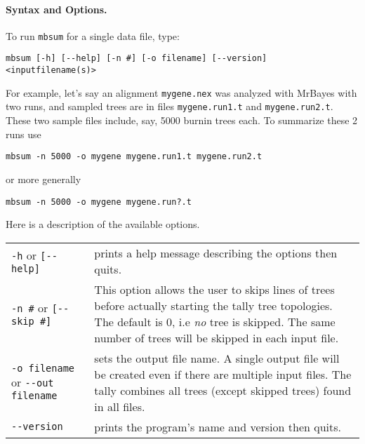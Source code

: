 \documentclass[12pt,english,final,letterpaper]{article}
\newcommand{\com}[1]{}
\begin{document}
\paragraph{Syntax and Options.}
To run {\tt mbsum} for a single data file, type:
\begin{verbatim}
mbsum [-h] [--help] [-n #] [-o filename] [--version] <inputfilename(s)> 
\end{verbatim}
For example, let's say an alignment \texttt{mygene.nex} was 
analyzed with MrBayes with two runs, and sampled trees are in files
\texttt{mygene.run1.t} and \texttt{mygene.run2.t}. These two
sample files include, say, 5000 burnin trees each. To summarize 
these 2 runs  use
\begin{verbatim}
mbsum -n 5000 -o mygene mygene.run1.t mygene.run2.t
\end{verbatim}
or more generally
\begin{verbatim}
mbsum -n 5000 -o mygene mygene.run?.t
\end{verbatim}
\com{
 Note: the older version of \texttt{mbsum} could only take a single
 file. It was then necessary to have a single file for each locus, 
 and to combine all independent MrBayes runs from the same locus
 into a single file. This is no longer necessary. 
 With version 1.2b of \texttt{mbsum}, there can be several 
 input files, such as several parallel runs from MrBayes.
}
Here is a description of the available options.
\begin{center}
\begin{tabular}{p{1.59in}|p{4.7in}}
{\tt -h} or \verb+[--help]+& prints a help message describing the options
then quits.\\
{\tt -n \#} or \verb+[--skip #]+& This option allows the user to 
skips lines of trees before actually starting the tally tree 
topologies. The default is 0, i.e {\em no} tree is skipped. 
The same number of trees will be skipped in each input file.\\
{\tt -o filename} or \verb+--out filename+& sets the output file name. A single output
file will be created even if there are multiple input files.
The tally combines all trees (except skipped trees) found in all 
files. \\
\verb+--version+& prints the program's name and version then quits.
\end{tabular}\end{center}
\com{ fixit:
 Since {\tt mbsum} needs to be run on all tree files {\tt *.t}, we provide
 here a way to do so very efficiently. 
 \begin{verbatim}
 for X in *.t; do mbsum -n 1000 $X; done
 \end{verbatim} %
}
\end{document}
